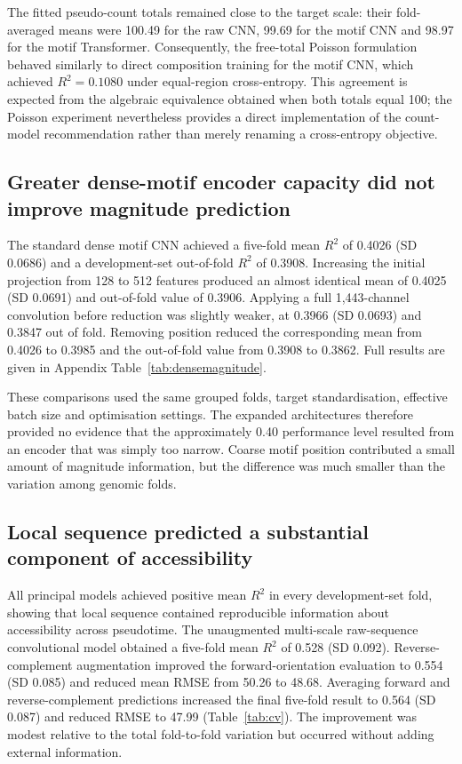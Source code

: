 \documentclass[a4paper,12pt]{article}
\begin{document}
The fitted pseudo-count totals remained close to the target scale: their fold-averaged means were 100.49 for the raw CNN, 99.69 for the motif CNN and 98.97 for the motif Transformer. Consequently, the free-total Poisson formulation behaved similarly to direct composition training for the motif CNN, which achieved $R^2=0.1080$ under equal-region cross-entropy. This agreement is expected from the algebraic equivalence obtained when both totals equal 100; the Poisson experiment nevertheless provides a direct implementation of the count-model recommendation rather than merely renaming a cross-entropy objective.

\subsection{Greater dense-motif encoder capacity did not improve magnitude prediction}

The standard dense motif CNN achieved a five-fold mean $R^2$ of 0.4026 (SD 0.0686) and a development-set out-of-fold $R^2$ of 0.3908. Increasing the initial projection from 128 to 512 features produced an almost identical mean of 0.4025 (SD 0.0691) and out-of-fold value of 0.3906. Applying a full 1,443-channel convolution before reduction was slightly weaker, at 0.3966 (SD 0.0693) and 0.3847 out of fold. Removing position reduced the corresponding mean from 0.4026 to 0.3985 and the out-of-fold value from 0.3908 to 0.3862. Full results are given in Appendix Table~\ref{tab:densemagnitude}.

These comparisons used the same grouped folds, target standardisation, effective batch size and optimisation settings. The expanded architectures therefore provided no evidence that the approximately 0.40 performance level resulted from an encoder that was simply too narrow. Coarse motif position contributed a small amount of magnitude information, but the difference was much smaller than the variation among genomic folds.

\subsection{Local sequence predicted a substantial component of accessibility}

All principal models achieved positive mean $R^2$ in every development-set fold, showing that local sequence contained reproducible information about accessibility across pseudotime. The unaugmented multi-scale raw-sequence convolutional model obtained a five-fold mean $R^2$ of 0.528 (SD 0.092). Reverse-complement augmentation improved the forward-orientation evaluation to 0.554 (SD 0.085) and reduced mean RMSE from 50.26 to 48.68. Averaging forward and reverse-complement predictions increased the final five-fold result to 0.564 (SD 0.087) and reduced RMSE to 47.99 (Table~\ref{tab:cv}). The improvement was modest relative to the total fold-to-fold variation but occurred without adding external information.
\end{document}
